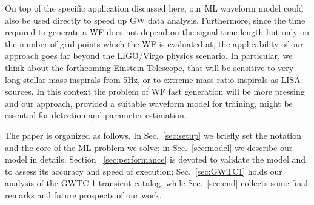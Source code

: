 \documentclass[twocolumn,showpacs,preprintnumbers,nofootinbib,prd,
superscriptaddress,10pt]{revtex4-1}
\begin{document}
%
On top of the specific application discussed here, our ML waveform model could also be used directly 
to speed up GW data analysis.
Furthermore, since the time required to generate a WF does not depend
on the signal time length but only on the number of grid points which the WF is evaluated at,
the applicability of our approach goes far beyond the LIGO/Virgo physics scenario. In particular,
we think about the forthcoming Einstein Telescope, that will be sensitive to very long stellar-mass 
inspirals from 5Hz, or to extreme mass ratio inspirals as LISA sources. In this context the problem
of WF fast generation will be more pressing and our approach, provided a suitable waveform model 
for training,  might be essential for detection and parameter estimation. 

The paper is organized as follows. In Sec.~\ref{sec:setup} we briefly set the 
notation and the core of the ML problem we solve; in Sec.~\ref{sec:model} we describe 
our model in details. Section ~\ref{sec:performance} is devoted to validate the model 
and to assess its accuracy and speed of execution; Sec.~\ref{sec:GWTC1} holds 
our analysis of the GWTC-1 transient catalog, while  Sec.~\ref{sec:end} collects 
some final remarks and future prospects of our work.

\end{document}
